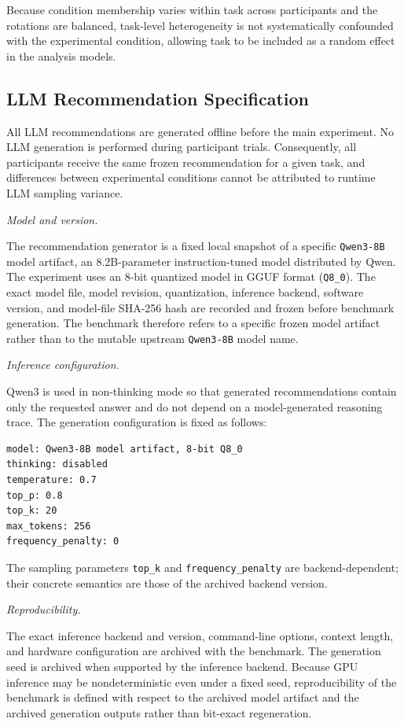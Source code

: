 \documentclass[oneside,final,14pt,a4paper]{extreport}
\begin{document}
Because condition membership varies within task across participants and the
rotations are balanced, task-level heterogeneity is not systematically
confounded with the experimental condition, allowing task to be included as a
random effect in the analysis models.

\subsection{LLM Recommendation Specification}
\label{subsec:llm-spec}

All LLM recommendations are generated offline before the main experiment. No
LLM generation is performed during participant trials. Consequently, all
participants receive the same frozen recommendation for a given task, and
differences between experimental conditions cannot be attributed to runtime
LLM sampling variance.

\emph{Model and version.}

The recommendation generator is a fixed local snapshot of a specific
\texttt{Qwen3-8B} model artifact, an 8.2B-parameter instruction-tuned model
distributed by Qwen. The experiment uses an 8-bit quantized model in GGUF
format (\texttt{Q8\_0}). The exact model file, model revision, quantization,
inference backend, software version, and model-file SHA-256 hash are recorded
and frozen before benchmark generation. The benchmark therefore refers to a
specific frozen model artifact rather than to the mutable upstream
\texttt{Qwen3-8B} model name.

\emph{Inference configuration.}

Qwen3 is used in non-thinking mode so that generated recommendations contain
only the requested answer and do not depend on a model-generated reasoning
trace. The generation configuration is fixed as follows:

\begin{verbatim}
model: Qwen3-8B model artifact, 8-bit Q8_0
thinking: disabled
temperature: 0.7
top_p: 0.8
top_k: 20
max_tokens: 256
frequency_penalty: 0
\end{verbatim}

The sampling parameters \texttt{top\_k} and \texttt{frequency\_penalty} are
backend-dependent; their concrete semantics are those of the archived backend
version.

\emph{Reproducibility.}

The exact inference backend and version, command-line options, context
length, and hardware configuration are archived with the benchmark. The
generation seed is archived when supported by the inference backend. Because
GPU inference may be nondeterministic even under a fixed seed, reproducibility
of the benchmark is defined with respect to the archived model artifact and
the archived generation outputs rather than bit-exact regeneration.
\end{document}
